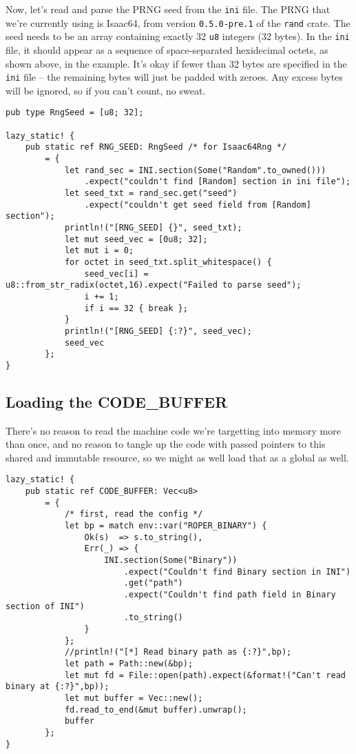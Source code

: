 \documentclass[11pt]{article}
\begin{document}
Now, let's read and parse the PRNG seed from the \texttt{ini} file. The PRNG
that we're currently using is Isaac64, from version \texttt{0.5.0-pre.1} of
the \texttt{rand} crate. The seed needs to be an array containing exactly 32 \texttt{u8}
integers (32 bytes). In the \texttt{ini} file, it should appear as a sequence of
space-separated hexidecimal octets, as shown above, in the example. It's
okay if fewer than 32 bytes are specified in the \texttt{ini} file -- the remaining
bytes will just be padded with zeroes. Any excess bytes will be ignored,
so if you can't count, no sweat.

\lstset{language=rust,label=orgcf605dc,caption= ,captionpos=b,numbers=none}
\begin{lstlisting}
pub type RngSeed = [u8; 32];

lazy_static! {
    pub static ref RNG_SEED: RngSeed /* for Isaac64Rng */
        = {
            let rand_sec = INI.section(Some("Random".to_owned()))
                .expect("couldn't find [Random] section in ini file");
            let seed_txt = rand_sec.get("seed")
                .expect("couldn't get seed field from [Random] section");
            println!("[RNG_SEED] {}", seed_txt);
            let mut seed_vec = [0u8; 32];
            let mut i = 0;
            for octet in seed_txt.split_whitespace() {
                seed_vec[i] = u8::from_str_radix(octet,16).expect("Failed to parse seed");
                i += 1;
                if i == 32 { break };
            }
            println!("[RNG_SEED] {:?}", seed_vec);
            seed_vec
        };
}
\end{lstlisting}

\subsection{Loading the CODE\_BUFFER}
\label{sec:orgcb7c98d}

There's no reason to read the machine code we're targetting into memory
more than once, and no reason to tangle up the code with passed pointers
to this shared and immutable resource, so we might as well load that as
a global as well.
\lstset{language=rust,label=org1d26fab,caption= ,captionpos=b,numbers=none}
\begin{lstlisting}
lazy_static! {
    pub static ref CODE_BUFFER: Vec<u8>
        = {
            /* first, read the config */
            let bp = match env::var("ROPER_BINARY") {
                Ok(s)  => s.to_string(),
                Err(_) => {
                    INI.section(Some("Binary"))
                        .expect("Couldn't find Binary section in INI")
                        .get("path")
                        .expect("Couldn't find path field in Binary section of INI")
                        .to_string()
                }
            };
            //println!("[*] Read binary path as {:?}",bp);
            let path = Path::new(&bp);
            let mut fd = File::open(path).expect(&format!("Can't read binary at {:?}",bp));
            let mut buffer = Vec::new();
            fd.read_to_end(&mut buffer).unwrap();
            buffer
        };
}
\end{lstlisting}
\end{document}
